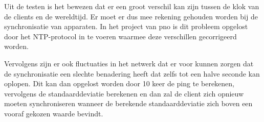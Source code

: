 Uit de testen is het bewezen dat er een groot verschil kan zijn tussen de klok van de clients en de wereldtijd. Er moet er dus mee rekening gehouden worden bij de synchronisatie van apparaten. In het project van pno is dit probleem opgelost door het NTP-protocol in te voeren waarmee deze verschillen gecorrigeerd worden.

Vervolgens zijn er ook fluctuaties in het netwerk dat er voor kunnen zorgen dat de synchronisatie een slechte benadering heeft dat zelfs tot een halve seconde kan oplopen. Dit kan dan opgelost worden door 10 keer de ping te berekenen, vervolgens de standaarddeviatie berekenen en dan zal de client zich opnieuw moeten synchroniseren wanneer de berekende standaarddeviatie zich boven een vooraf gekozen waarde bevindt.